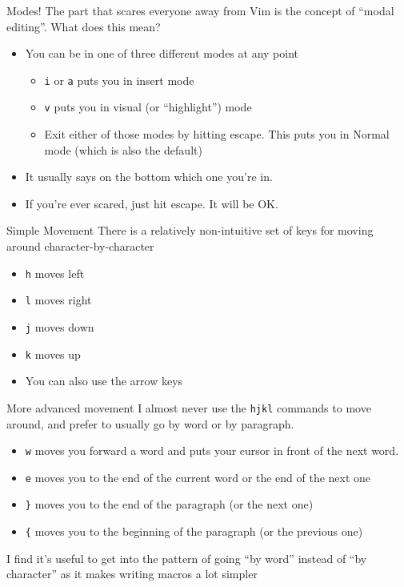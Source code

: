 \documentclass{beamer}
\begin{document}
\begin{frame}{Modes!}
	The part that scares everyone away from Vim is the concept of ``modal editing''. What does this mean? 
	\begin{itemize}
		\item You can be in one of three different modes at any point \begin{itemize}
				\item \texttt{i} or \texttt{a} puts you in insert mode
				\item \texttt{v} puts you in visual (or ``highlight'') mode
				\item Exit either of those modes by hitting escape.  This puts you in Normal mode (which is also the default)
		\end{itemize}
		
		\item It usually says on the bottom which one you're in. 
		\item If you're ever scared, just hit escape.  It will be OK. 
	\end{itemize}
\end{frame} 
\begin{frame}{Simple Movement}
  There is a relatively non-intuitive set of keys for moving around character-by-character
  \begin{itemize}
	  \item \texttt{h} moves left
	  \item \texttt{l} moves right 
	  \item \texttt{j} moves down 
	  \item \texttt{k} moves up 

          
  \end{itemize}
  \begin{itemize}
	  \item You can also use the arrow keys
          
  \end{itemize}
\end{frame}
\begin{frame}{More advanced movement}
	I almost never use the \texttt{hjkl} commands to move around, and prefer to usually go by word or by paragraph.  
	\begin{itemize}
		\item \texttt{w} moves you forward a word and puts your cursor in front of the next word. 
		\item \texttt{e} moves you to the end of the current word or the end of the next one
		\item \texttt{\}} moves you to the end of the paragraph (or the next one)
		\item \texttt{\{} moves you to the beginning of the paragraph (or the previous one)
	\end{itemize}
	I find it's useful to get into the pattern of going ``by word'' instead of ``by character'' as it makes writing macros a lot simpler
\end{frame}
\end{document}
